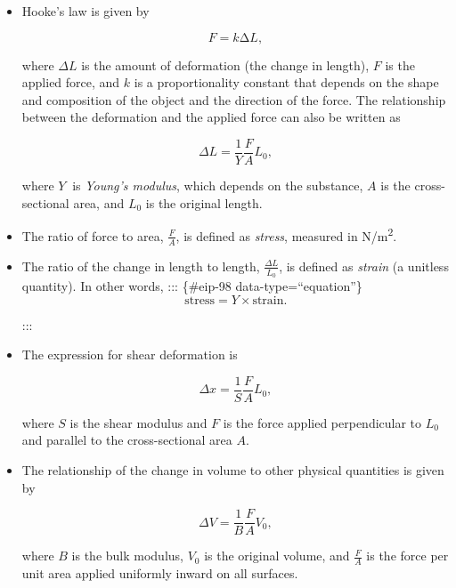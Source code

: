\documentclass[
]{book}
\begin{document}
\begin{itemize}
\item
  \protect\hypertarget{import-auto-id1165298476009}{}{Hooke's law is given by}

  \leavevmode\hypertarget{eip-149}{}%
  \[{{F = k\text{Δ}L},}{}\]

  where \({\Delta L}{}\) is the amount of deformation (the change in
  length), \(F{}\) is the applied force, and \(k{}\) is a proportionality
  constant that depends on the shape and composition of the object and
  the direction of the force. The relationship between the deformation
  and the applied force can also be written as

  \leavevmode\hypertarget{eip-556}{}%
  \[{{{\Delta L = \frac{1}{Y}}\frac{F}{A}L_{0}},}{}\]

  where \emph{\(Y\ {}\)} is \emph{Young's modulus},
  which depends on the substance, \emph{\(A{}\)} is the cross-sectional area,
  and \(L_{0}{}\) is the original length.
\item
  \protect\hypertarget{import-auto-id1165298686194}{}{The ratio of force to area, \emph{\(\frac{F}{A}{}\)}, is defined as
  \emph{stress}, measured in N/m\textsuperscript{2}.}
\item
  \protect\hypertarget{import-auto-id1165298726978}{}{The ratio of the change in length to length,
  \(\frac{\Delta L}{L_{0}}{}\), is defined as \emph{strain} (a unitless
  quantity). In other words,}
  ::: \{\#eip-98 data-type=``equation''\}
  \[{\text{stress} = {Y \times \text{strain}}.}{}\]

  :::
\item
  \protect\hypertarget{import-auto-id1165298586473}{}{The expression for shear deformation
  is}

  \leavevmode\hypertarget{eip-19}{}%
  \[{{{\Delta x = \frac{1}{S}}\frac{F}{A}L_{0}},}{}\]

  where \(S\) is the shear modulus and \(F\) is the force applied
  perpendicular to \(L_{\text{0}}\) and parallel to the cross-sectional
  area \(A\).
\item
  \protect\hypertarget{import-auto-id1165298548492}{}{The relationship of the change in volume to other physical
  quantities is given by}

  \leavevmode\hypertarget{eip-492}{}%
  \[{{{\Delta V = \frac{1}{B}}\frac{F}{A}V_{0}},}{}\]

  where \(B\) is the bulk modulus, \(V_{\text{0}}\) is the original
  volume, and \(\frac{F}{A}{}\) is the force per unit area applied
  uniformly inward on all surfaces.
\end{itemize}
\end{document}
